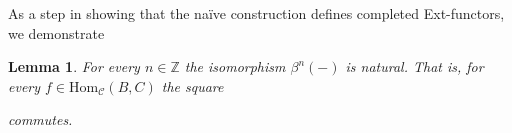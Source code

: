 \documentclass[12pt,a4paper]{article}
\numberwithin{equation}{section}
\newtheorem{lem}[thm]{Lemma}
\theoremstyle{nonumberplain}
\begin{document}
As a step in showing that the naïve construction defines completed Ext-functors, we demonstrate

\begin{lem}\label{lem:betanatural}
For every $n \in \mathbb{Z}$ the isomorphism $\beta^n(-)$ is natural. That is, for every $f \in \mathrm{Hom}_{\mathcal{C}}(B, C)$ the square
\begin{center}
\end{center}
commutes.
\end{lem}
\end{document}

